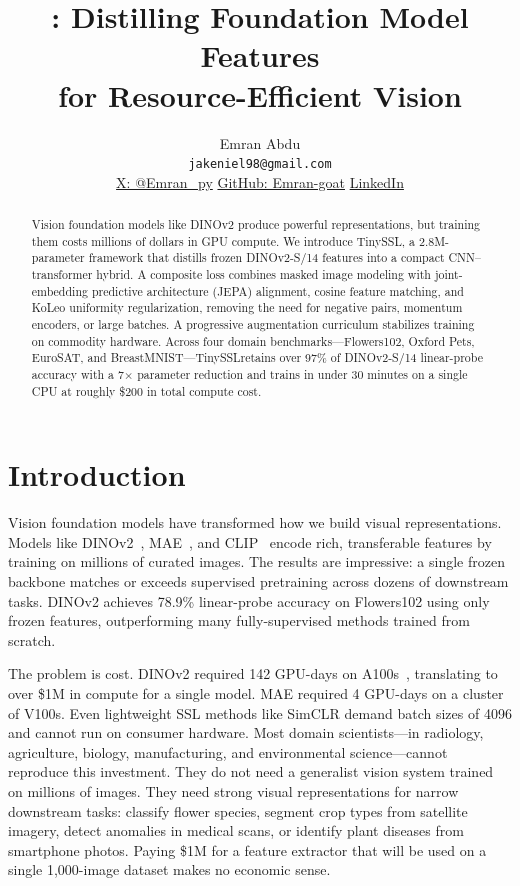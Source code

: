 \documentclass{article}
\title{\textbf{\method}: Distilling Foundation Model Features\\for Resource-Efficient Vision}
\author{
  Emran Abdu\\
  \texttt{jakeniel98@gmail.com}\\
  \href{https://x.com/Emran_py}{X: @Emran\_py} \quad
  \href{https://github.com/Emran-goat}{GitHub: Emran-goat} \quad
  \href{https://www.linkedin.com/in/emran-abdu-833981315/}{LinkedIn}
}
\newcommand{\method}{TinySSL}
\begin{document}
\maketitle

\begin{abstract}
Vision foundation models like DINOv2 produce powerful representations, but training them costs millions of dollars in GPU compute. We introduce \method, a 2.8M-parameter framework that distills frozen DINOv2-S/14 features into a compact CNN--transformer hybrid. A composite loss combines masked image modeling with joint-embedding predictive architecture (JEPA) alignment, cosine feature matching, and KoLeo uniformity regularization, removing the need for negative pairs, momentum encoders, or large batches. A progressive augmentation curriculum stabilizes training on commodity hardware. Across four domain benchmarks---Flowers102, Oxford Pets, EuroSAT, and BreastMNIST---\method retains over 97\% of DINOv2-S/14 linear-probe accuracy with a 7$\times$ parameter reduction and trains in under 30 minutes on a single CPU at roughly \$200 in total compute cost.
\end{abstract}

\section{Introduction}
\label{sec:intro}

Vision foundation models have transformed how we build visual representations. Models like DINOv2~\cite{dino2}, MAE~\cite{mae}, and CLIP~\cite{clip} encode rich, transferable features by training on millions of curated images. The results are impressive: a single frozen backbone matches or exceeds supervised pretraining across dozens of downstream tasks. DINOv2 achieves 78.9\% linear-probe accuracy on Flowers102 using only frozen features, outperforming many fully-supervised methods trained from scratch.

The problem is cost. DINOv2 required 142 GPU-days on A100s~\cite{dino2}, translating to over \$1M in compute for a single model. MAE required 4 GPU-days on a cluster of V100s. Even lightweight SSL methods like SimCLR demand batch sizes of 4096 and cannot run on consumer hardware. Most domain scientists---in radiology, agriculture, biology, manufacturing, and environmental science---cannot reproduce this investment. They do not need a generalist vision system trained on millions of images. They need strong visual representations for narrow downstream tasks: classify flower species, segment crop types from satellite imagery, detect anomalies in medical scans, or identify plant diseases from smartphone photos. Paying \$1M for a feature extractor that will be used on a single 1,000-image dataset makes no economic sense.
\end{document}
